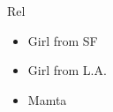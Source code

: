 \begin{frame}
\begin{columns}
\begin{column}{0.20\linewidth}
\begin{block}{Rel}
  \begin{itemize} 
    \small \item \small Girl from SF 
    \small \item \small Girl from L.A. 
    \small \item \small Mamta 

  \end{itemize} 
\end{block} 
\end{column}%

\end{columns}

\end{frame}

